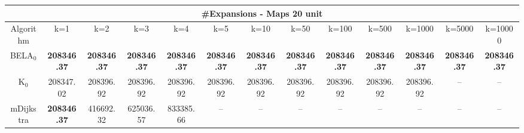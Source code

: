 \begin{tabular}{c|cccccccccccc}\toprule
\multicolumn{13}{c}{#Expansions - Maps 20 unit}\\ \midrule
Algorithm & k=1 & k=2 & k=3 & k=4 & k=5 & k=10 & k=50 & k=100 & k=500 & k=1000 & k=5000 & k=10000 \\ \midrule
BELA$_0$ & \textbf{208346.37} & \textbf{208346.37} & \textbf{208346.37} & \textbf{208346.37} & \textbf{208346.37} & \textbf{208346.37} & \textbf{208346.37} & \textbf{208346.37} & \textbf{208346.37} & \textbf{208346.37} & \textbf{208346.37} & \textbf{208346.37} \\
K$_0$ & 208347.02 & 208396.92 & 208396.92 & 208396.92 & 208396.92 & 208396.92 & 208396.92 & 208396.92 & 208396.92 & 208396.92 & -- & -- \\
mDijkstra & \textbf{208346.37} & 416692.32 & 625036.57 & 833385.66 & -- & -- & -- & -- & -- & -- & -- & -- \\ \bottomrule 
\end{tabular}

